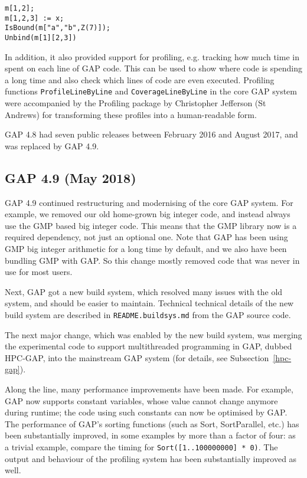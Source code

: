 \documentclass{deliverablereport}
\begin{document}
{\small
\begin{verbatim}
m[1,2];
m[1,2,3] := x;
IsBound(m["a","b",Z(7)]);
Unbind(m[1][2,3])
\end{verbatim}
}

In addition, it also provided 
support for profiling, e.g. tracking how much time in spent on 
each line of GAP code. This can be used to show where code is spending 
a long time and also check which lines of code are even executed. Profiling
functions \verb|ProfileLineByLine| and \verb|CoverageLineByLine| in the core 
GAP system were accompanied by the {\sf Profiling} package by Christopher Jefferson 
(St Andrews) for transforming these profiles into a human-readable form.

GAP 4.8 had seven public releases between February 2016 and August 2017, and
was replaced by GAP 4.9.

\subsection{GAP 4.9 (May 2018)}

GAP 4.9 continued restructuring and modernising of the core GAP system.
For example, we removed our old home-grown big integer code, and instead always 
use the GMP based big integer code. This means that the GMP library 
now is a required dependency, not just an optional one. Note that GAP 
has been using GMP big integer arithmetic for a long time by default, 
and we also have been bundling GMP with GAP. So this change mostly 
removed code that was never in use for most users.

Next, GAP got a new build system, which resolved many issues with the old
system, and should be easier to maintain. Technical technical details
of the new build system are described in {\tt README.buildsys.md} from
the GAP source code. 

The next major change, which was enabled by the new build system, was 
merging the experimental code to support multithreaded programming in GAP, 
dubbed HPC-GAP, into the mainstream GAP system (for details, see
Subsection~\ref{hpc-gap}).

Along the line, many performance improvements have been made. For example,
GAP now supports constant variables, whose value cannot change anymore 
during runtime; the code using such constants can now be optimised by GAP.
The performance of GAP's sorting functions (such as Sort, SortParallel, 
etc.) has been substantially improved, in some examples by more than a 
factor of four: as a trivial example, compare the timing for 
{\tt Sort([1..100000000] * 0)}. %
The output and behaviour of the profiling system has been substantially improved
as well.
\end{document}

